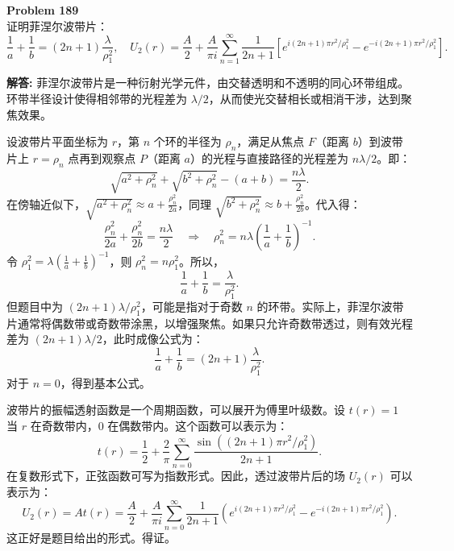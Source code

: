\documentclass[12pt, a4paper, oneside]{ctexart}
\newenvironment{solution}{\par\noindent\textbf{解答:}\quad}{\par}
\begin{document}
\begin{mdframed}[backgroundcolor=gray!10, linewidth=0pt]
    \textbf{Problem 189} \\
    证明菲涅尔波带片：
    \[
    \frac{1}{a} + \frac{1}{b} = (2n+1) \frac{\lambda}{\rho_1^2}, \quad U_2(r) = \frac{A}{2} + \frac{A}{\pi i} \sum_{n=1}^{\infty} \frac{1}{2n+1} \left[ e^{i(2n+1)\pi r^2/\rho_1^2} - e^{-i(2n+1)\pi r^2/\rho_1^2} \right].
    \]
\end{mdframed}
\begin{solution}
    菲涅尔波带片是一种衍射光学元件，由交替透明和不透明的同心环带组成。环带半径设计使得相邻带的光程差为 $\lambda/2$，从而使光交替相长或相消干涉，达到聚焦效果。

    设波带片平面坐标为 $r$，第 $n$ 个环的半径为 $\rho_n$，满足从焦点 $F$（距离 $b$）到波带片上 $r=\rho_n$ 点再到观察点 $P$（距离 $a$）的光程与直接路径的光程差为 $n\lambda/2$。即：
    \[
    \sqrt{a^2+\rho_n^2} + \sqrt{b^2+\rho_n^2} - (a+b) = \frac{n\lambda}{2}.
    \]
    在傍轴近似下，$\sqrt{a^2+\rho_n^2} \approx a + \frac{\rho_n^2}{2a}$，同理 $\sqrt{b^2+\rho_n^2} \approx b + \frac{\rho_n^2}{2b}$。代入得：
    \[
    \frac{\rho_n^2}{2a} + \frac{\rho_n^2}{2b} = \frac{n\lambda}{2} \quad \Rightarrow \quad \rho_n^2 = n \lambda \left( \frac{1}{a} + \frac{1}{b} \right)^{-1}.
    \]
    令 $\rho_1^2 = \lambda \left( \frac{1}{a} + \frac{1}{b} \right)^{-1}$，则 $\rho_n^2 = n \rho_1^2$。所以，
    \[
    \frac{1}{a} + \frac{1}{b} = \frac{\lambda}{\rho_1^2}.
    \]
    但题目中为 $(2n+1)\lambda/\rho_1^2$，可能是指对于奇数 $n$ 的环带。实际上，菲涅尔波带片通常将偶数带或奇数带涂黑，以增强聚焦。如果只允许奇数带透过，则有效光程差为 $(2n+1)\lambda/2$，此时成像公式为：
    \[
    \frac{1}{a} + \frac{1}{b} = (2n+1) \frac{\lambda}{\rho_1^2}.
    \]
    对于 $n=0$，得到基本公式。

    波带片的振幅透射函数是一个周期函数，可以展开为傅里叶级数。设 $t(r) = 1$ 当 $r$ 在奇数带内，$0$ 在偶数带内。这个函数可以表示为：
    \[
    t(r) = \frac{1}{2} + \frac{2}{\pi} \sum_{n=0}^{\infty} \frac{\sin((2n+1)\pi r^2/\rho_1^2)}{2n+1}.
    \]
    在复数形式下，正弦函数可写为指数形式。因此，透过波带片后的场 $U_2(r)$ 可以表示为：
    \[
    U_2(r) = A t(r) = \frac{A}{2} + \frac{A}{\pi i} \sum_{n=0}^{\infty} \frac{1}{2n+1} \left( e^{i(2n+1)\pi r^2/\rho_1^2} - e^{-i(2n+1)\pi r^2/\rho_1^2} \right).
    \]
    这正好是题目给出的形式。得证。
\end{solution}
\end{document}
